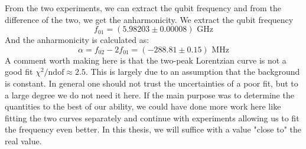 From the two experiments, we can extract the qubit frequency and from the difference of the two, we get the anharmonicity. We extract the qubit frequency
\begin{equation}
    f_{01} = (5.98203 \pm 0.00008) \text{ GHz}
\end{equation}
And the anharmonicity is calculated as:
\begin{equation}
    \alpha = f_{02} - 2f_{01} = (-288.81 \pm 0.15) \text{ MHz}
\end{equation}
A comment worth making here is that the two-peak Lorentzian curve is not a good fit $\chi^2/\text{ndof} \approx 2.5$. This is largely due to an assumption that the background is constant. In general one should not trust the uncertainties of a poor fit, but to a large degree we do not need it here. If the main purpose was to determine the quantities to the best of our ability, we could have done more work here like fitting the two curves separately and continue with experiments allowing us to fit the frequency even better. In this thesis, we will suffice with a value "close to" the real value.


